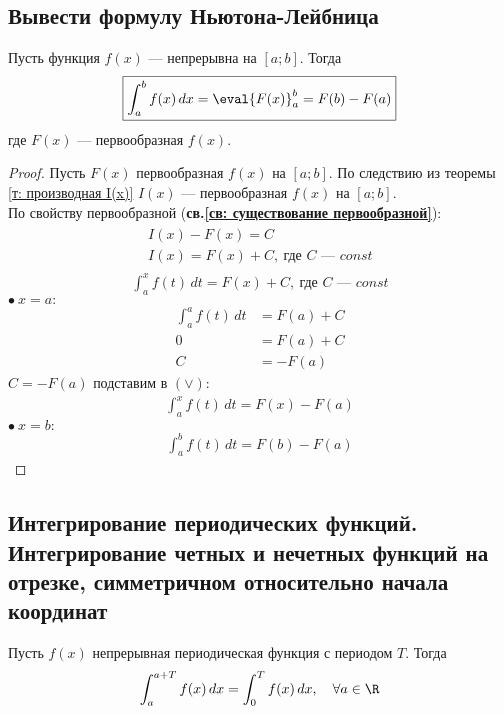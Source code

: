 \subsection{Вывести формулу Ньютона-Лейбница}
\setcounter{theorem}{11}
\begin{theorem}
    Пусть функция $f(x)$ --- непрерывна на $[a;b]$. Тогда
    \begin{gather*}
        \boxed{\int_{a}^{b} f(x)\, dx = \eval{F(x)}_{a}^{b} =  F(b) - F(a)}
    \end{gather*}
    где $F(x)$ --- первообразная $f(x)$.
\end{theorem}
\begin{proof}
    Пусть $F(x)$ первообразная $f(x)$ на $[a;b]$. По следствию из теоремы \ref{т: производная I(x)} $I(x)$ --- первообразная $f(x)$ на $[a;b]$. \\
    По свойству первообразной (\textbf{св.\ref{св: существование первообразной}}): 
    \begin{gather*}
        \begin{aligned}
            & I(x) - F(x) = C \\ 
            & I(x) = F(x) + C,\ \text{где } C \text{ --- } const
        \end{aligned} \\[1ex]
        \int_{a}^{x} f(t)\, dt = F(x) + C,\ \text{где } C \text{ --- } const \tag{$\vee$}
    \end{gather*}
    $\bullet\ x = a\colon$
    \begin{align*}
        \int_{a}^{a} f(t)\, dt &= F(a) + C \\
        0 &= F(a) + C \\
        C &= -F(a)
    \end{align*}
    $C = -F(a)$ подставим в $(\vee)\colon$
    \begin{gather*}
        \int_{a}^{x} f(t)\, dt = F(x) - F(a)
    \end{gather*}
    $\bullet\ x = b\colon$
    \begin{gather*}
        \boxed{\int_{a}^{b} f(t)\, dt = F(b) - F(a)}
    \end{gather*}
\end{proof}

\newpage
\subsection{Интегрирование периодических функций. Интегрирование четных и нечетных функций на отрезке, симметричном относительно начала координат}
\begin{theorem}
    Пусть $f(x)$ непрерывная периодическая функция с периодом $T$. Тогда \vspace{-\topsep}
    \[
        \int_{a}^{a + T} f(x)\, dx = \int_{0}^{T} f(x)\, dx,\quad \forall a \in \R
    \]
\end{theorem}

